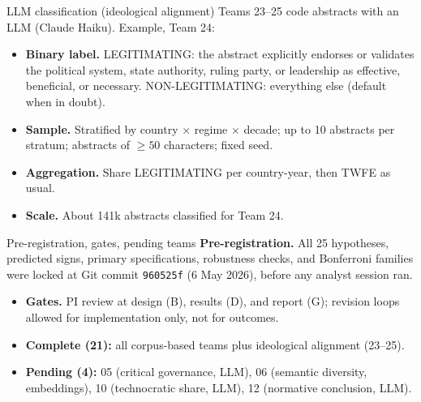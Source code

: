 \documentclass[aspectratio=169,11pt]{beamer}
\begin{document}
\begin{frame}{LLM classification (ideological alignment)}
  \hypertarget{ap:llm}{}
  \small
  Teams 23--25 code abstracts with an LLM (Claude Haiku). Example, Team 24:
  \vspace{0.3em}
  \begin{itemize}
    \item \textbf{Binary label.} LEGITIMATING: the abstract explicitly endorses or
          validates the political system, state authority, ruling party, or leadership
          as effective, beneficial, or necessary. NON-LEGITIMATING: everything else
          (default when in doubt).
    \item \textbf{Sample.} Stratified by country $\times$ regime $\times$ decade; up to
          10 abstracts per stratum; abstracts of $\geq 50$ characters; fixed seed.
    \item \textbf{Aggregation.} Share LEGITIMATING per country-year, then TWFE as usual.
    \item \textbf{Scale.} About 141k abstracts classified for Team 24.
  \end{itemize}
  \vfill
  \hfill\hyperlink{ap:toc}{}
\end{frame}

\begin{frame}{Pre-registration, gates, pending teams}
  \hypertarget{ap:prereg}{}
  \small
  \textbf{Pre-registration.} All 25 hypotheses, predicted signs, primary specifications,
  robustness checks, and Bonferroni families were locked at Git commit \texttt{960525f}
  (6 May 2026), before any analyst session ran.
  \vspace{0.3em}
  \begin{itemize}
    \item \textbf{Gates.} PI review at design (B), results (D), and report (G); revision
          loops allowed for implementation only, not for outcomes.
    \item \textbf{Complete (21):} all corpus-based teams plus ideological alignment (23--25).
    \item \textbf{Pending (4):} 05 (critical governance, LLM), 06 (semantic diversity,
          embeddings), 10 (technocratic share, LLM), 12 (normative conclusion, LLM).
  \end{itemize}
  \vfill
  \hfill\hyperlink{ap:toc}{}
\end{frame}
\end{document}
